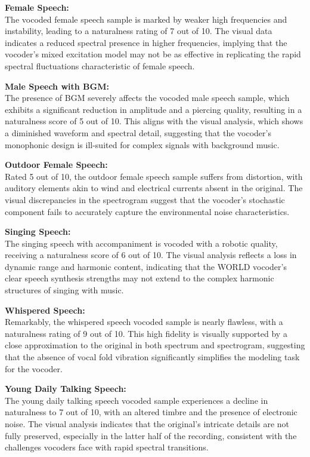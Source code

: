 \documentclass{../labbook}
\begin{document}
\begin{solution}
    \textbf{Female Speech:}\\
    The vocoded female speech sample is marked by weaker high frequencies and instability, leading to a naturalness rating of 7 out of 10. The visual data indicates a reduced spectral presence in higher frequencies, implying that the vocoder's mixed excitation model may not be as effective in replicating the rapid spectral fluctuations characteristic of female speech.
    
    \textbf{Male Speech with BGM:}\\
    The presence of BGM severely affects the vocoded male speech sample, which exhibits a significant reduction in amplitude and a piercing quality, resulting in a naturalness score of 5 out of 10. This aligns with the visual analysis, which shows a diminished waveform and spectral detail, suggesting that the vocoder's monophonic design is ill-suited for complex signals with background music.
    
    \textbf{Outdoor Female Speech:}\\
    Rated 5 out of 10, the outdoor female speech sample suffers from distortion, with auditory elements akin to wind and electrical currents absent in the original. The visual discrepancies in the spectrogram suggest that the vocoder's stochastic component fails to accurately capture the environmental noise characteristics.
    
    \textbf{Singing Speech:}\\
    The singing speech with accompaniment is vocoded with a robotic quality, receiving a naturalness score of 6 out of 10. The visual analysis reflects a loss in dynamic range and harmonic content, indicating that the WORLD vocoder's clear speech synthesis strengths may not extend to the complex harmonic structures of singing with music.
    
    \textbf{Whispered Speech:}\\
    Remarkably, the whispered speech vocoded sample is nearly flawless, with a naturalness rating of 9 out of 10. This high fidelity is visually supported by a close approximation to the original in both spectrum and spectrogram, suggesting that the absence of vocal fold vibration significantly simplifies the modeling task for the vocoder.
    
    \textbf{Young Daily Talking Speech:}\\
    The young daily talking speech vocoded sample experiences a decline in naturalness to 7 out of 10, with an altered timbre and the presence of electronic noise. The visual analysis indicates that the original's intricate details are not fully preserved, especially in the latter half of the recording, consistent with the challenges vocoders face with rapid spectral transitions.
    

\end{solution}
\end{document}
